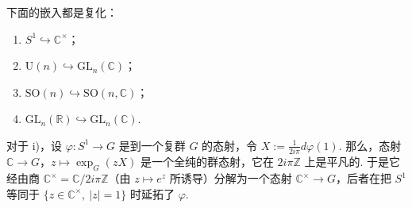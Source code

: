\begin{numpara}
\begin{example*}
下面的嵌入都是复化：
\begin{enumerate}[label=\roman*)]
\item $S^{1}\hookrightarrow\mathbb C^{\times}$；
\item $\mathrm{U}(n)\hookrightarrow\mathrm{GL}_n(\mathbb C)$；
\item $\mathrm{SO}(n)\hookrightarrow\mathrm{SO}(n,\mathbb C)$；
\item $\mathrm{GL}_n(\mathbb R)\hookrightarrow\mathrm{GL}_n(\mathbb C)$.
\end{enumerate}
对于 i)，设 $\varphi:S^{1}\longrightarrow G$ 是到一个复群 $G$ 的态射，令 $X:=\frac{1}{2i\pi}d\varphi(1)$. 那么，态射 $\mathbb C\longrightarrow G$，$z\mapsto\exp_G(zX)$ 是一个全纯的群态射，它在 $2i\pi\mathbb Z$ 上是平凡的. 于是它经由商 $\mathbb C^{\times}=\mathbb C/2i\pi\mathbb Z$（由 $z\mapsto e^{z}$ 所诱导）分解为一个态射 $\mathbb C^{\times}\longrightarrow G$，后者在把 $S^{1}$ 等同于 $\{z\in\mathbb C^{\times},\ |z|=1\}$ 时延拓了 $\varphi$.
\end{example*}
\end{numpara}
